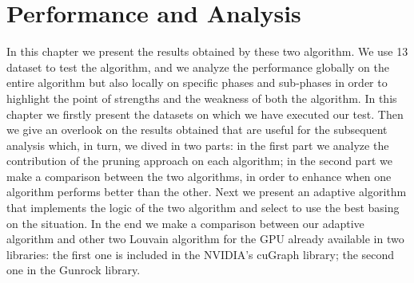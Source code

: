 \section{Performance and Analysis}
In this chapter we present the results obtained by these two algorithm. We use 13 dataset to test the algorithm, and we analyze the performance globally on the entire algorithm but also locally on specific phases and sub-phases in order to highlight the point of strengths and the weakness of both the algorithm. In this chapter we firstly present the datasets on which we have executed our test. Then we give an overlook on the results obtained that are useful for the subsequent analysis which, in turn, we dived in two parts: in the first part we analyze the contribution of the pruning approach on each algorithm; in the second part we make a comparison between the two algorithms, in order to enhance when one algorithm performs better than the other. Next we present an adaptive algorithm that implements the logic of the two algorithm and select to use the best basing on the situation.
In the end we make a comparison between our adaptive algorithm and other two Louvain algorithm for the GPU already available in two libraries: the first one is included in the NVIDIA's cuGraph library; the second one in the Gunrock library.
